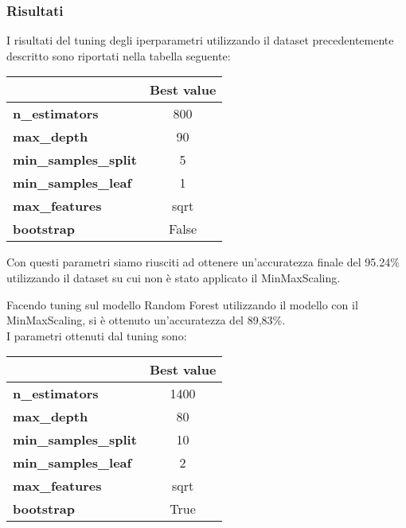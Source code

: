 \documentclass[../../Report.tex]{subfiles}
\begin{document}
\subsubsection{Risultati}

I risultati del tuning degli iperparametri utilizzando il dataset precedentemente descritto sono riportati nella tabella seguente:

\begin{table}[H]
    \centering
    \begin{tabular}{|l|c|}
        \hline
        & \textbf{Best value} \\
        \hline
        \textbf{n\_estimators} & 800 \\
        \hline
        \textbf{max\_depth} & 90 \\
        \hline
        \textbf{min\_samples\_split} & 5 \\
        \hline
        \textbf{min\_samples\_leaf} & 1 \\
        \hline
        \textbf{max\_features} & sqrt \\
        \hline
        \textbf{bootstrap} & False \\
        \hline
    \end{tabular}
\end{table}

Con questi parametri siamo riusciti ad ottenere un'accuratezza finale del 95.24\% utilizzando il dataset su cui non è stato applicato il MinMaxScaling.

Facendo tuning sul modello Random Forest utilizzando il modello con il MinMaxScaling, si è ottenuto un'accuratezza del 89,83\%.\\
I parametri ottenuti dal tuning sono:

\begin{table}[H]
    \centering
    \begin{tabular}{|l|c|}
        \hline
        & \textbf{Best value} \\
        \hline
        \textbf{n\_estimators} & 1400 \\
        \hline
        \textbf{max\_depth} & 80 \\
        \hline
        \textbf{min\_samples\_split} & 10 \\
        \hline
        \textbf{min\_samples\_leaf} & 2 \\
        \hline
        \textbf{max\_features} & sqrt \\
        \hline
        \textbf{bootstrap} & True \\
        \hline
    \end{tabular}
\end{table}
\end{document}
